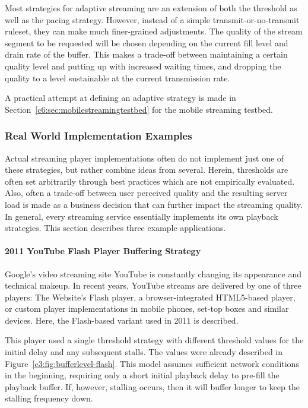 Most strategies for adaptive streaming are an extension of both the threshold as well as the pacing strategy. However, instead of a simple transmit-or-no-transmit ruleset, they can make much finer-grained adjustments. The quality of the stream segment to be requested will be chosen depending on the current fill level and drain rate of the buffer. This makes a trade-off between maintaining a certain quality level and putting up with increased waiting times, and dropping the quality to a level sustainable at the current transmission rate.

A practical attempt at defining an adaptive strategy is made in Section~\ref{c6:sec:mobilestreamingtestbed} for the mobile streaming testbed.


\subsubsection{Real World Implementation Examples}

Actual streaming player implementations often do not implement just one of these strategies, but rather combine ideas from several. Herein, thresholds are often set arbitrarily through best practices which are not empirically evaluated. Also, often a trade-off between user perceived quality and the resulting server load is made as a business decision that can further impact the streaming quality. In general, every streaming service essentially implements its own playback strategies. This section describes three example applications.

\paragraph{2011 YouTube Flash Player Buffering Strategy}

Google's video streaming site YouTube is constantly changing its appearance and technical makeup. In recent years, YouTube streams are delivered by one of three players: The Website's Flash player, a browser-integrated \acrshort{HTML}5-based player, or custom player implementations in mobile phones, set-top boxes and similar devices. Here, the Flash-based variant used in 2011 is described.

This player used a single threshold strategy with different threshold values for the initial delay and any subsequent stalls. The values were already described in Figure~\ref{c3:fig:bufferlevel-flash}. This model assumes sufficient network conditions in the beginning, requiring only a short initial playback delay to pre-fill the playback buffer. If, however, stalling occurs, then it will buffer longer to keep the stalling frequency down.

